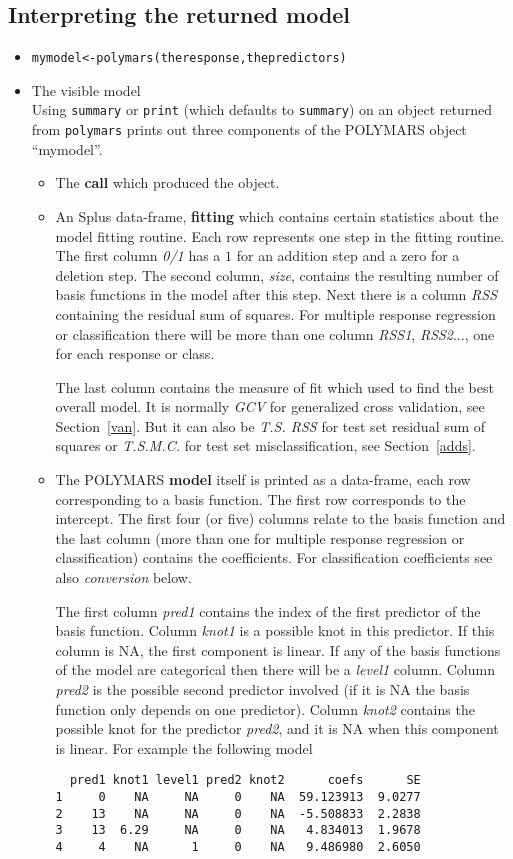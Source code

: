 \subsection{Interpreting the returned model}
\begin{itemize}
\item {\tt mymodel<-polymars(theresponse,thepredictors)}

\item The visible model\\
Using {\tt summary} or {\tt print} (which defaults to {\tt summary})
on an object returned from {\tt polymars} prints out three components
of the POLYMARS object ``mymodel''.
\begin{itemize}
\item The {\bf call} which produced the object.
\item An Splus data-frame, {\bf fitting} which contains certain
statistics about the model fitting routine. Each row represents one
step in the fitting routine. The first column {\em 0/1} has a $1$ for an
addition step and a zero for a deletion step. The second column, {\em
size}, contains the resulting number of basis functions in the model
after this step. Next there is a column {\em RSS} containing the
residual sum of squares. For multiple response regression or
classification there will be more than one column {\em RSS1}, {\em
RSS2}$\ldots$, one for each response or class. 

The last column contains the measure of fit which used to find the best overall
model. It is normally {\em GCV} for generalized cross validation, see
Section~\ref{van}. But it can also be {\em T.S. RSS} for test set
residual sum of squares or {\em T.S.M.C.} for test set
misclassification, see Section~\ref{adds}.

\item The POLYMARS {\bf model} itself is printed as a data-frame, each
row corresponding to a basis function. The first
row corresponds to the intercept.
The first four (or five) columns relate to the basis function and the last
column (more than one for multiple response regression or
classification) contains the coefficients. For classification
coefficients see also {\em conversion} below.

The first column {\em pred1} contains the index
of the first predictor of the basis function. Column {\em knot1} is a
possible knot in this predictor. If this column is NA, the first
component is linear. If 
any of the basis functions of the model are categorical then there will be a 
{\em level1} column. Column {\em pred2} is the possible second predictor
involved (if it is NA the basis function only depends on one 
predictor). Column {\em knot2} contains the possible knot for the
predictor {\em pred2}, and it is NA when this component is linear. 
For example the following model
\begin{verbatim}
  pred1 knot1 level1 pred2 knot2      coefs      SE 
1     0    NA     NA     0    NA  59.123913  9.0277
2    13    NA     NA     0    NA  -5.508833  2.2838
3    13  6.29     NA     0    NA   4.834013  1.9678
4     4    NA      1     0    NA   9.486980  2.6050
\end{verbatim} 


\end{itemize}
\end{itemize}
